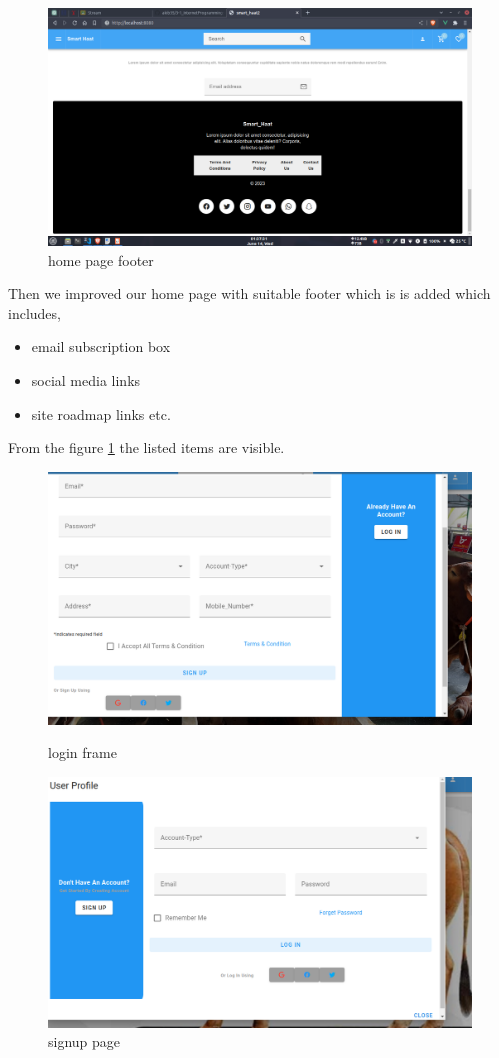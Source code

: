 \documentclass[a4paper,12pt]{report}
\begin{document}
\begin{figure}[]
	\includegraphics[keepaspectratio, width=\linewidth]{footer.png}
	\caption{home page footer}
	\label{footer}
\end{figure}
Then we improved our home page with suitable footer which is  is added which includes,
\begin{itemize}
	\item email subscription box
	\item social media links
	\item site roadmap links etc.
\end{itemize}
From the figure \ref{footer} the listed items are visible.

\begin{figure}[]
	\includegraphics[keepaspectratio, width=\linewidth]{signin.png}
	\caption{login frame}
	\label{login}
	\includegraphics[keepaspectratio , width=\linewidth]{signup.png}
	\caption{signup page}
	\label{signup}
\end{figure}
\end{document}

